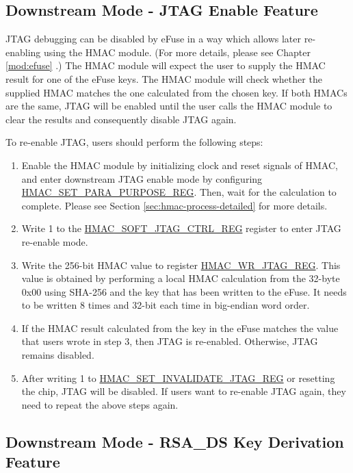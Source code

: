 \documentclass[main\_\_EN.tex]{subfiles}
\begin{document}
\subsection{Downstream Mode - JTAG Enable Feature}

JTAG debugging can be disabled by eFuse in a way which allows later re-enabling using the HMAC module. (For more details, please see Chapter \ref{mod:efuse} \textit{}.) The HMAC module will expect the user to supply the HMAC result for one of the eFuse keys. The HMAC module will check whether the supplied HMAC matches the one calculated from the chosen key. If both HMACs are the same, JTAG will be enabled until the user calls the HMAC module to clear the results and consequently disable JTAG again.

To re-enable JTAG, users should perform the following steps:

\begin{enumerate}
\item Enable the HMAC module by initializing clock and reset signals of HMAC, and enter downstream JTAG enable mode by configuring \hyperref[regdesc:HMACSETPARAPURPOSEREG]{HMAC\_SET\_PARA\_PURPOSE\_REG}. Then, wait for the calculation to complete. Please see Section \ref{sec:hmac-process-detailed} for more details.
\item Write 1 to the \hyperref[regdesc:HMACSOFTJTAGCTRLREG]{HMAC\_SOFT\_JTAG\_CTRL\_REG} register to enter JTAG re-enable mode.
\item Write the 256-bit HMAC value to register \hyperref[regdesc:HMACWRJTAGREG]{HMAC\_WR\_JTAG\_REG}. This value is obtained by performing a local HMAC calculation from the 32-byte 0x00 using SHA-256 and the key that has been written to the eFuse. It needs to be written 8 times and 32-bit each time in big-endian word order.
\item If the HMAC result calculated from the key in the eFuse matches the value that users wrote in step 3, then JTAG is re-enabled. Otherwise, JTAG remains disabled.
\item After writing 1 to \hyperref[regdesc:HMACSETINVALIDATEJTAGREG]{HMAC\_SET\_INVALIDATE\_JTAG\_REG} or resetting the chip, JTAG will be disabled. If users want to re-enable JTAG again, they need to repeat the above steps again.
\end{enumerate}


\subsection{Downstream Mode - RSA\_DS Key Derivation Feature}
\end{document}
